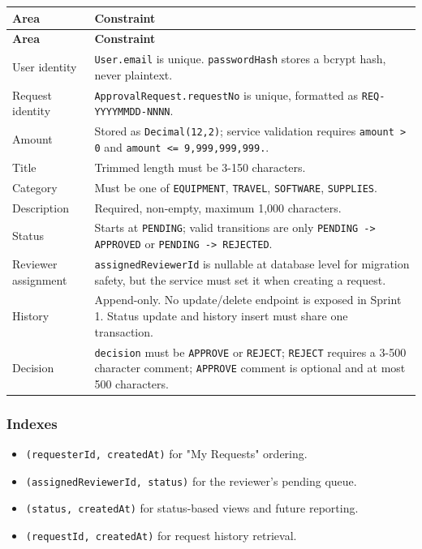 \documentclass[11pt,a4paper]{article}
\begin{document}
\vspace{0.3em}
\begin{longtable}{|>{\RaggedRight}p{4.5cm}|>{\RaggedRight}p{11.3cm}|}
\hline
\rowcolor{zenPale}\textbf{Area} & \textbf{Constraint} \\ \hline
\endfirsthead
\hline
\rowcolor{zenPale}\textbf{Area} & \textbf{Constraint} \\ \hline
\endhead
\hline
\endfoot
User identity & \texttt{User.\allowbreak email} is unique. \texttt{passwordHash} stores a bcrypt hash, never plaintext. \\ \hline
Request identity & \texttt{ApprovalRequest.\allowbreak requestNo} is unique, formatted as \texttt{REQ-\allowbreak YYYYMMDD-\allowbreak NNNN}. \\ \hline
Amount & Stored as \texttt{Decimal(12,2)}; service validation requires \texttt{amount > 0} and \texttt{amount <= 9,999,999,999.\allowbreak 99}. \\ \hline
Title & Trimmed length must be 3-150 characters. \\ \hline
Category & Must be one of \texttt{EQUIPMENT}, \texttt{TRAVEL}, \texttt{SOFTWARE}, \texttt{SUPPLIES}. \\ \hline
Description & Required, non-empty, maximum 1,000 characters. \\ \hline
Status & Starts at \texttt{PENDING}; valid transitions are only \texttt{PENDING -\allowbreak > APPROVED} or \texttt{PENDING -\allowbreak > REJECTED}. \\ \hline
Reviewer assignment & \texttt{assignedReviewerId} is nullable at database level for migration safety, but the service must set it when creating a request. \\ \hline
History & Append-only. No update/delete endpoint is exposed in Sprint 1. Status update and history insert must share one transaction. \\ \hline
Decision & \texttt{decision} must be \texttt{APPROVE} or \texttt{REJECT}; \texttt{REJECT} requires a 3-500 character comment; \texttt{APPROVE} comment is optional and at most 500 characters. \\ \hline
\end{longtable}
\vspace{0.3em}

\subsubsection{Indexes}

\begin{itemize}[leftmargin=*,itemsep=2pt,topsep=2pt]
  \item \texttt{(requesterId, createdAt)} for "My Requests" ordering.
  \item \texttt{(assignedReviewerId, status)} for the reviewer's pending queue.
  \item \texttt{(status, createdAt)} for status-based views and future reporting.
  \item \texttt{(requestId, createdAt)} for request history retrieval.
\end{itemize}
\end{document}
